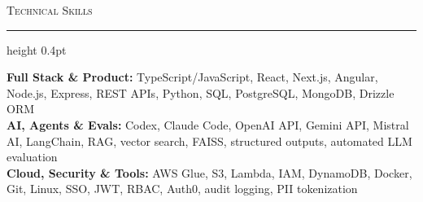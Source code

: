 \documentclass[letterpaper,11pt]{article}
\newcommand{\resumesection}[1]{%
  \par\vspace{2pt}%
  {\large\scshape #1}\par\vspace{2pt}%
  \hrule height 0.4pt\vspace{2pt}%
}
\begin{document}
\resumesection{Technical Skills}
\textbf{Full Stack \& Product:} TypeScript/JavaScript, React, Next.js, Angular, Node.js, Express, REST APIs, Python, SQL, PostgreSQL, MongoDB, Drizzle ORM\\
\textbf{AI, Agents \& Evals:} Codex, Claude Code, OpenAI API, Gemini API, Mistral AI, LangChain, RAG, vector search, FAISS, structured outputs, automated LLM evaluation\\
\textbf{Cloud, Security \& Tools:} AWS Glue, S3, Lambda, IAM, DynamoDB, Docker, Git, Linux, SSO, JWT, RBAC, Auth0, audit logging, PII tokenization
\end{document}
